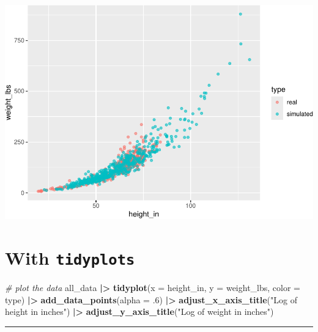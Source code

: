 \documentclass[
]{article}
\newenvironment{Shaded}{\begin{snugshade}}{\end{snugshade}}
\newcommand{\AttributeTok}[1]{\textcolor[rgb]{0.13,0.29,0.53}{#1}}
\newcommand{\CommentTok}[1]{\textcolor[rgb]{0.56,0.35,0.01}{\textit{#1}}}
\newcommand{\DecValTok}[1]{\textcolor[rgb]{0.00,0.00,0.81}{#1}}
\newcommand{\FunctionTok}[1]{\textcolor[rgb]{0.13,0.29,0.53}{\textbf{#1}}}
\newcommand{\NormalTok}[1]{#1}
\newcommand{\SpecialCharTok}[1]{\textcolor[rgb]{0.81,0.36,0.00}{\textbf{#1}}}
\newcommand{\StringTok}[1]{\textcolor[rgb]{0.31,0.60,0.02}{#1}}
\begin{document}
\includegraphics{L6_Correlation_and_regresion_simulation_pdf_files/figure-latex/plot sim data-1.pdf}

\hypertarget{with-tidyplots}{%
\section{\texorpdfstring{With
\textbf{\texttt{tidyplots}}}{With tidyplots}}\label{with-tidyplots}}

\begin{Shaded}
\begin{Highlighting}[]
\CommentTok{\# plot the data}
\NormalTok{all\_data }\SpecialCharTok{|\textgreater{}}
  \FunctionTok{tidyplot}\NormalTok{(}\AttributeTok{x =}\NormalTok{ height\_in, }
           \AttributeTok{y =}\NormalTok{ weight\_lbs,}
           \AttributeTok{color =}\NormalTok{ type) }\SpecialCharTok{|\textgreater{}}
  \FunctionTok{add\_data\_points}\NormalTok{(}\AttributeTok{alpha =}\NormalTok{ .}\DecValTok{6}\NormalTok{) }\SpecialCharTok{|\textgreater{}}
  \FunctionTok{adjust\_x\_axis\_title}\NormalTok{(}\StringTok{"Log of height in inches"}\NormalTok{) }\SpecialCharTok{|\textgreater{}}
  \FunctionTok{adjust\_y\_axis\_title}\NormalTok{(}\StringTok{"Log of weight in inches"}\NormalTok{)}
\end{Highlighting}
\end{Shaded}

\begin{center}\rule{0.5\linewidth}{0.5pt}\end{center}
\end{document}
